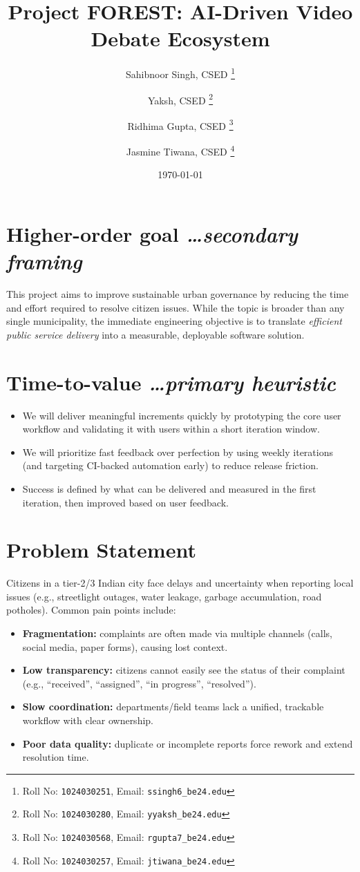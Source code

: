 \documentclass[11pt,a4paper]{article}
\title{Project FOREST: AI-Driven Video Debate Ecosystem}
\author{
  Sahibnoor Singh, CSED%
  \thanks{Roll No: \texttt{1024030251}, %
    Email: \texttt{ssingh6\_be24\@thapar.edu}}
  \and 
  Yaksh, CSED%
  \thanks{Roll No: \texttt{1024030280}, %
    Email: \texttt{yyaksh\_be24\@thapar.edu}}
  \and 
  Ridhima Gupta, CSED%
  \thanks{Roll No: \texttt{1024030568}, %
    Email: \texttt{rgupta7\_be24\@thapar.edu}}
  \and 
  Jasmine Tiwana, CSED%
  \thanks{Roll No: \texttt{1024030257}, %
    Email: \texttt{jtiwana\_be24\@thapar.edu}}
}
\date{\today}
\newcommand{\BvrHint}[1]{%
  {\normalfont\normalsize\itshape\hfill #1}}
\begin{document}
\maketitle

\section{Higher-order goal%
  \BvrHint{\ldots secondary framing}}
This project aims to improve sustainable urban
governance by reducing the time and effort required to
resolve citizen issues. While the topic is broader than
any single municipality, the immediate engineering
objective is to translate \emph{efficient public
  service delivery} into a measurable, deployable
software solution.

\section{Time-to-value %
\BvrHint{\ldots primary heuristic}}
\begin{itemize}[leftmargin=0.7cm]
    \item We will deliver meaningful increments quickly by prototyping the core user workflow and validating it with users within a short iteration window.
    \item We will prioritize fast feedback over perfection by using weekly iterations (and targeting CI-backed automation early) to reduce release friction.
    \item Success is defined by what can be delivered and measured in the first iteration, then improved based on user feedback.
\end{itemize}

\section{Problem Statement}
Citizens in a tier-2/3 Indian city face delays and uncertainty when reporting local issues (e.g., streetlight outages, water leakage, garbage accumulation, road potholes). Common pain points include:
\begin{itemize}[leftmargin=0.7cm]
    \item \textbf{Fragmentation:} complaints are often made via multiple channels (calls, social media, paper forms), causing lost context.
    \item \textbf{Low transparency:} citizens cannot easily see the status of their complaint (e.g., ``received'', ``assigned'', ``in progress'', ``resolved'').
    \item \textbf{Slow coordination:} departments/field teams lack a unified, trackable workflow with clear ownership.
    \item \textbf{Poor data quality:} duplicate or incomplete reports force rework and extend resolution time.
\end{itemize}
\end{document}
